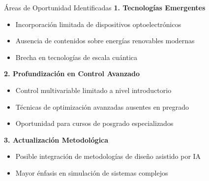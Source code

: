 \documentclass[aspectratio=43]{beamer}
\begin{document}
  \begin{frame}{Áreas de Oportunidad Identificadas}
  \textbf{1. Tecnologías Emergentes}
  \begin{itemize}
  \item Incorporación limitada de dispositivos optoelectrónicos
  \item Ausencia de contenidos sobre energías renovables modernas
  \item Brecha en tecnologías de escala cuántica
  \end{itemize}
  
  \pause
  
  \textbf{2. Profundización en Control Avanzado}
  \begin{itemize}
  \item Control multivariable limitado a nivel introductorio
  \item Técnicas de optimización avanzadas ausentes en pregrado
  \item Oportunidad para cursos de posgrado especializados
  \end{itemize}
  
  \pause
  
  \textbf{3. Actualización Metodológica}
  \begin{itemize}
  \item Posible integración de metodologías de diseño asistido por IA
  \item Mayor énfasis en simulación de sistemas complejos
  \end{itemize}
  
  \end{frame}
  
\end{document}
